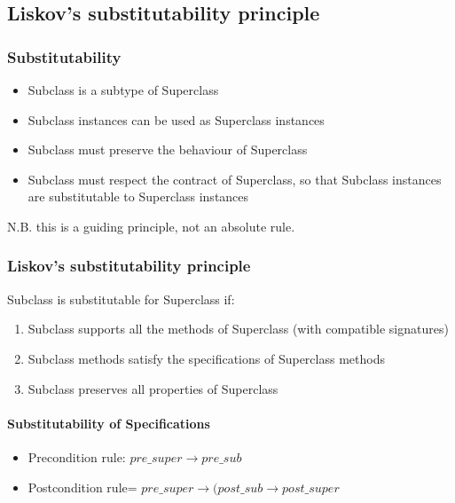 \subsection{Liskov’s substitutability principle}

\begin{figure}[!ht]
    \centering
    
\end{figure}

\subsubsection{Substitutability}

\begin{itemize}
    \item Subclass is a subtype of Superclass
    \item Subclass instances can be used as Superclass instances
    \item Subclass must preserve the behaviour of Superclass
    \item Subclass must respect the contract of Superclass, so that Subclass instances are substitutable to Superclass instances
\end{itemize}

N.B. this is a guiding principle, not an absolute rule. \newline

\subsubsection{Liskov’s substitutability principle}

Subclass is substitutable for Superclass if:

\begin{enumerate}
    \item Subclass supports all the methods of Superclass (with compatible signatures)
    \item Subclass methods satisfy the specifications of Superclass methods
    \item Subclass preserves all properties of Superclass
\end{enumerate}

\paragraph{Substitutability of Specifications}
\begin{itemize}
	\item Precondition rule: $pre\_super \rightarrow pre\_sub$
	\item Postcondition rule= $pre\_super \rightarrow (post\_sub \rightarrow post\_super$
\end{itemize}


